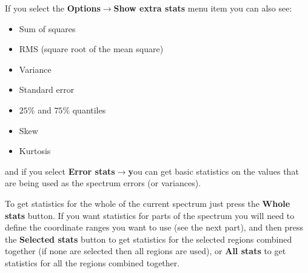 \documentclass[twoside,11pt]{article}
\newcommand{\latexhtml}[2]{#1}
\renewcommand{\_}{\texttt{\symbol{95}}}
\newcommand{\submenuitem}[2]{\latexhtml{\textbf{#1$\rightarrow$#2}}{\textbf{#1->#2}}}
\newcommand{\labelitem}[1]{\textbf{#1}}
\begin{document}
If you select the \submenuitem{Options}{Show extra stats} menu item
you can also see:
\begin{itemize}
\item Sum of squares
\item RMS (square root of the mean square)
\item Variance
\item Standard error
\item $25\%$ and $75\%$ quantiles
\item Skew
\item Kurtosis
\end{itemize}
and if you select \submenuitem{Error stats} you can get basic statistics
on the values that are being used as the spectrum errors (or variances).

To get statistics for the whole of the current spectrum just press the
\labelitem{Whole stats} button. If you want statistics for parts of the
spectrum you will need to define the coordinate ranges you want to use (see
the next part), and then press the \labelitem{Selected stats} button to get
statistics for the selected regions combined together (if none are selected
then all regions are used), or \labelitem{All stats} to get statistics for all
the regions combined together.
\end{document}
